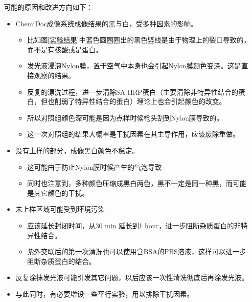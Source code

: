 \documentclass[UTF-8]{ctexart}
\begin{document}
可能的原因和改进方向如下：
\begin{itemize}
    \item ChemiDoc成像系统成像结果的黑与白，受多种因素的影响。
    \begin{itemize}
        \item 比如图\ref{实验结果}中蓝色圆圈圈出的黑色竖线是由于物理上的裂口导致的，而不是有核酸或是蛋白。
        \item 发光液浸泡Nylon膜，置于空气中本身也会引起Nylon膜颜色变深。这是直接观察的结果。
        \item 反复的漂洗过程，进一步清除SA-HRP蛋白（主要清除非特异性结合的蛋白，但也削弱了特异性结合的蛋白）理论上也会引起颜色的改变。
        \item 所以对照组颜色深可能是因为点样时候枪头刮到Nylon膜导致的。
        \item 这一次对照组的结果大概率是干扰因素在其主导作用，应该废除重做。
    \end{itemize}
    \item 没有上样的部分，成像黑白颜色不稳定。
    \begin{itemize}
        \item 这可能由于防止Nylon膜时候产生的气泡导致
        \item 同时也注意到，多种颜色压缩成黑白两色，黑不一定是同一种黑，而可能是其它颜色的干扰。
    \end{itemize}
    \item 未上样区域可能受到环境污染
    \begin{itemize}
        \item 应该延长封闭时间，从30 min 延长到1 hour，进一步阻断杂质蛋白的非特异性结合。
        \item 紫外交联后的第一次清洗也可以使用含BSA的PBS溶液，这样可以进一步阻断杂质蛋白的结合。
    \end{itemize}
    \item 反复涂抹发光液可能引发其它问题，以后应该一次性清洗彻底后再涂发光液。
    \item 与此同时，有必要增设一些平行实验，用以排除干扰因素。
\end{itemize}
 






\end{document}
